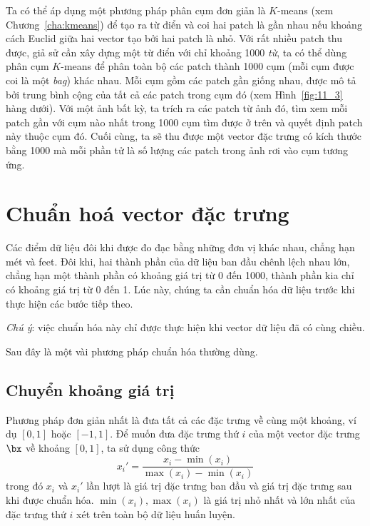 Ta có thể áp dụng một phương pháp phân cụm đơn giản là $K$-means
(xem Chương~\ref{cha:kmeans}) để tạo ra từ điển và coi hai patch là gần nhau nếu
khoảng cách Euclid giữa hai vector tạo bởi hai patch là nhỏ. Với rất nhiều patch
thu được, giả sử cần xây dựng một từ điển với chỉ khoảng 1000 \textit{từ}, ta có
thể dùng phân cụm $K$-means để phân toàn bộ các patch thành 1000 cụm (mỗi
cụm được coi là một \textit{bag}) khác nhau. Mỗi cụm gồm các patch gần giống
nhau, được mô tả bởi trung bình cộng của tất cả các patch trong cụm đó (xem
Hình~\ref{fig:11_3} hàng dưới). Với một ảnh bất kỳ, ta trích ra các patch từ ảnh
đó, tìm xem mỗi patch gần với cụm nào nhất trong 1000 cụm tìm được ở trên và
quyết định patch này thuộc cụm đó. Cuối cùng, ta sẽ thu được một vector đặc
trưng có kích thước bằng 1000 mà mỗi phần tử là số lượng các patch trong ảnh rơi
vào cụm tương ứng.


\section{Chuẩn hoá vector đặc trưng}
 
Các điểm dữ liệu đôi khi được đo đạc bằng những đơn vị khác nhau, chẳng hạn mét
và feet. Đôi khi, hai thành phần của dữ liệu ban đầu chênh lệch nhau lớn, chẳng
hạn một thành phần có khoảng giá trị từ 0 đến 1000, thành phần kia chỉ có khoảng
giá trị từ 0 đến 1. Lúc này, chúng ta cần chuẩn hóa dữ liệu trước khi thực hiện
các bước tiếp theo.
 
\textit{Chú ý}: việc chuẩn hóa này chỉ được thực hiện khi vector dữ liệu đã có cùng chiều. 
 
Sau đây là một vài phương pháp chuẩn hóa thường dùng.

\subsection{Chuyển khoảng giá trị}
Phương pháp đơn giản nhất là đưa tất cả các đặc trưng về cùng một khoảng, ví dụ $[0, 1]$ hoặc $[-1, 1]$. Để muốn đưa đặc trưng thứ
$i$ của một vector đặc trưng $\bx$ về khoảng $[0, 1]$, ta sử dụng công thức
\begin{equation*} 
x_i' = \frac{x_i - \min(x_i)}{\max(x_i) - \min(x_i)} 
\end{equation*} 
trong đó $x_i$ và $x_i'$ lần lượt là giá trị đặc trưng ban đầu và giá trị đặc
trưng sau khi được chuẩn hóa. $\min(x_i), \max(x_i)$ là giá trị nhỏ nhất và lớn
nhất của đặc trưng thứ $i$ xét trên toàn bộ dữ liệu huấn luyện.
 
